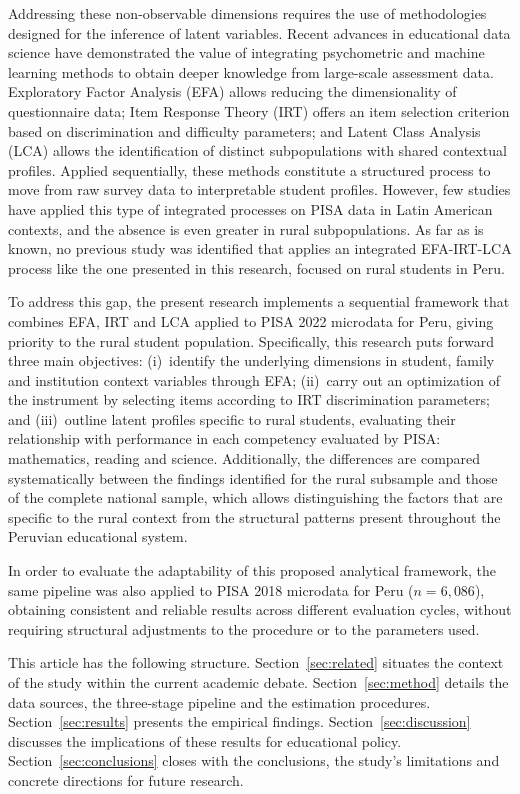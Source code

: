 \documentclass[runningheads]{llncs}
\begin{document}
Addressing these non-observable dimensions requires the use of
methodologies designed for the inference of latent variables.
Recent advances in educational data science have demonstrated
the value of integrating psychometric and machine learning
methods to obtain deeper knowledge from large-scale assessment
data. Exploratory Factor Analysis (EFA) allows reducing the
dimensionality of questionnaire data; Item Response Theory (IRT)
offers an item selection criterion based on discrimination and
difficulty parameters; and Latent Class Analysis (LCA) allows
the identification of distinct subpopulations with shared
contextual profiles. Applied sequentially, these methods
constitute a structured process to move from raw survey data to
interpretable student profiles. However, few studies have
applied this type of integrated processes on PISA data in Latin
American contexts, and the absence is even greater in rural
subpopulations. As far as is known, no previous study was
identified that applies an integrated EFA-IRT-LCA process like
the one presented in this research, focused on rural students in
Peru.

To address this gap, the present research implements a
sequential framework that combines EFA, IRT and LCA applied to
PISA 2022 microdata for Peru, giving priority to the rural
student population. Specifically, this research puts forward
three main objectives: (i)~identify the underlying dimensions in
student, family and institution context variables through EFA;
(ii)~carry out an optimization of the instrument by selecting
items according to IRT discrimination parameters; and
(iii)~outline latent profiles specific to rural students,
evaluating their relationship with performance in each
competency evaluated by PISA: mathematics, reading and science.
Additionally, the differences are compared systematically
between the findings identified for the rural subsample and
those of the complete national sample, which allows
distinguishing the factors that are specific to the rural
context from the structural patterns present throughout the
Peruvian educational system.

In order to evaluate the adaptability of this proposed
analytical framework, the same pipeline was also applied to
PISA 2018 microdata for Peru (\(n=6{,}086\)), obtaining
consistent and reliable results across different evaluation
cycles, without requiring structural adjustments to the
procedure or to the parameters used.

This article has the following structure.
Section~\ref{sec:related} situates the context of the study
within the current academic debate. Section~\ref{sec:method}
details the data sources, the three-stage pipeline and the
estimation procedures. Section~\ref{sec:results} presents the
empirical findings. Section~\ref{sec:discussion} discusses the
implications of these results for educational policy.
Section~\ref{sec:conclusions} closes with the conclusions, the
study's limitations and concrete directions for future research.
\end{document}
